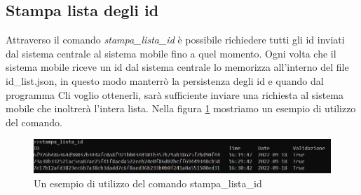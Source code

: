 \subsection{Stampa lista degli id}
Attraverso il comando \textit{stampa\_lista\_id} è possibile richiedere tutti gli id inviati dal sistema centrale al sistema mobile fino a quel momento. Ogni volta che il sistema mobile riceve un id dal sistema centrale lo memorizza all'interno del file id\_list.json, in questo modo manterrò la persistenza degli id e quando dal programma Cli voglio ottenerli, sarà sufficiente inviare una richiesta al sistema mobile che inoltrerà l'intera lista. Nella figura \ref{fig: stampalistaid } mostriamo un esempio di utilizzo del comando.
\begin{figure}[!h]
\centering
\includegraphics[scale=0.8]{images/stampa_lista_id.png}
\caption{Un esempio di utilizzo del comando stampa\_lista\_id}
\label{fig: stampalistaid }
\end{figure}

